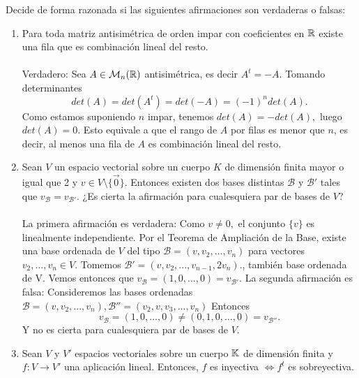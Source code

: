 \documentclass[12pt]{article}
\begin{document}
    \begin{ejercicio}
        Decide de forma razonada si las siguientes afirmaciones son verdaderas o falsas:
        \begin{enumerate}[label=(\alph*)]
            \item Para toda matriz antisimétrica de orden impar con coeficientes en ${\mathbb{R}}$ existe una fila que es combinación lineal del resto. \\\\
            Verdadero: Sea $A \in \mathcal{M}_n({\mathbb{R}})$ antisimétrica, es decir $A^t = -A.$ Tomando determinantes
            \begin{equation*}
                det(A) = det(A^t) = det(-A) = (-1)^ndet(A).
            \end{equation*}
             Como estamos suponiendo $n$ impar, tenemos $det(A) = -det(A),$ luego $det(A) = 0.$ Esto equivale a que el rango de $A$ por filas es menor que $n$, es decir, al menos una fila de $A$ es combinación lineal del resto.
            \item Sean $V$ un espacio vectorial sobre un cuerpo $K$ de dimensión finita mayor o igual que 2 y $v \in V \setminus \{\vec{0}\}.$ Entonces existen dos bases distintas $\mathcal{B}$ y $\mathcal{B'}$ tales que $v_{\mathcal{B}} = v_{\mathcal{B'}}$. ¿Es cierta la afirmación para cualesquiera par de bases de $V$? \\\\
            
            La primera afirmación es verdadera: Como $v \neq 0,$ el conjunto $\{v\}$ es linealmente independiente. Por el Teorema de Ampliación de la Base, existe una base ordenada de $V$ del tipo $\mathcal{B} = (v, v_2, \dotsc, v_n)$ para vectores $v_2,\dotsc,v_n \in V$. Tomemos $\mathcal{B'} = (v, v_2, ..., v_{n-1}, 2v_n).$, también base ordenada de V. Vemos entonces que $v_{\mathcal{B}} = (1, 0, ..., 0) = v_{\mathcal{B'}}$.
            La segunda afirmación es falsa: 
            Consideremos las bases ordenadas $\mathcal{B} = (v, v_2,..., v_n), \mathcal{B}'' = (v_2, v, v_3,..., v_n)$ Entonces
            \begin{equation*}
                v_\mathcal{B} = (1, 0, \dotsc, 0) \neq (0, 1, 0, \dotsc, 0) = v_{\mathcal{B}''}.
            \end{equation*}
            Y no es cierta para cualesquiera par de bases de $V$.
            \item Sean $V$ y $V'$ espacios vectoriales sobre un cuerpo ${\mathbb{K}}$ de dimensión finita y $f: V \rightarrow V'$ una aplicación lineal. Entonces, $f$ es inyectiva $\Leftrightarrow f^t$ es sobreyectiva. \\\\
            

\end{enumerate}
\end{ejercicio}
\end{document}
